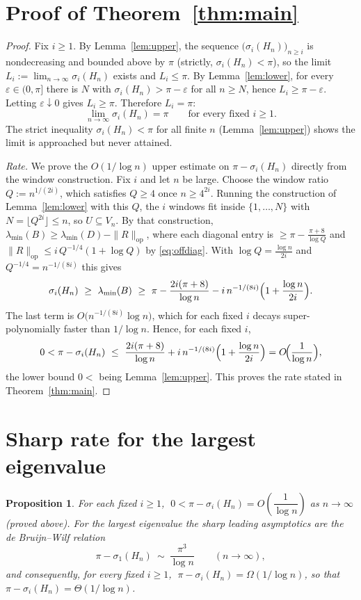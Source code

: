 \documentclass[12pt]{article}
\newtheorem{proposition}{Proposition}
\theoremstyle{remark}
\begin{document}
\section{Proof of Theorem~\ref{thm:main}}

\begin{proof}
Fix $i\ge1$. By Lemma~\ref{lem:upper}, the sequence $\bigl(\sigma_i(H_n)\bigr)_{n\ge i}$ is
nondecreasing and bounded above by $\pi$ (strictly, $\sigma_i(H_n)<\pi$), so the limit
$L_i:=\lim_{n\to\infty}\sigma_i(H_n)$ exists and $L_i\le\pi$. By Lemma~\ref{lem:lower}, for every
$\varepsilon\in(0,\pi]$ there is $N$ with $\sigma_i(H_n)>\pi-\varepsilon$ for all $n\ge N$, hence
$L_i\ge\pi-\varepsilon$. Letting $\varepsilon\downarrow0$ gives $L_i\ge\pi$. Therefore $L_i=\pi$:
\[
\lim_{n\to\infty}\sigma_i(H_n)=\pi\qquad\text{for every fixed }i\ge1 .
\]
The strict inequality $\sigma_i(H_n)<\pi$ for all finite $n$ (Lemma~\ref{lem:upper}) shows the
limit is approached but never attained.

\emph{Rate.} We prove the $O(1/\log n)$ upper estimate on $\pi-\sigma_i(H_n)$ directly from the
window construction. Fix $i$ and let $n$ be large. Choose the window ratio $Q:=n^{1/(2i)}$, which
satisfies $Q\ge4$ once $n\ge 4^{2i}$. Running the construction of Lemma~\ref{lem:lower} with this
$Q$, the $i$ windows fit inside $\{1,\dots,N\}$ with $N=\lfloor Q^{2i}\rfloor\le n$, so
$U\subseteq V_n$. By that construction,
$\lambda_{\min}(B)\ge\lambda_{\min}(D)-\|R\|_{\mathrm{op}}$, where each diagonal entry is
$\ge\pi-\frac{\pi+8}{\log Q}$ and $\|R\|_{\mathrm{op}}\le i\,Q^{-1/4}(1+\log Q)$ by
\eqref{eq:offdiag}. With $\log Q=\frac{\log n}{2i}$ and $Q^{-1/4}=n^{-1/(8i)}$ this gives
\[
\sigma_i(H_n)\ \ge\ \lambda_{\min}(B)\ \ge\
\pi-\frac{2i(\pi+8)}{\log n}-i\,n^{-1/(8i)}\Bigl(1+\frac{\log n}{2i}\Bigr).
\]
The last term is $O\bigl(n^{-1/(8i)}\log n\bigr)$, which for each fixed $i$ decays
super-polynomially faster than $1/\log n$. Hence, for each fixed $i$,
\[
0<\pi-\sigma_i(H_n)\ \le\ \frac{2i(\pi+8)}{\log n}+i\,n^{-1/(8i)}\Bigl(1+\frac{\log n}{2i}\Bigr)
=O\!\Bigl(\frac1{\log n}\Bigr),
\]
the lower bound $0<$ being Lemma~\ref{lem:upper}. This proves the rate stated in
Theorem~\ref{thm:main}.
\end{proof}

\section{Sharp rate for the largest eigenvalue}

\begin{proposition}\label{prop:rate}
For each fixed $i\ge1$, $\;0<\pi-\sigma_i(H_n)=O\!\left(\dfrac1{\log n}\right)$ as $n\to\infty$
(proved above). For the largest eigenvalue the sharp leading asymptotics are the de Bruijn--Wilf
relation
\[
\pi-\sigma_1(H_n)\ \sim\ \frac{\pi^3}{\log n}\qquad(n\to\infty),
\]
and consequently, for every fixed $i\ge1$,
$\;\pi-\sigma_i(H_n)=\Omega(1/\log n)$, so that $\pi-\sigma_i(H_n)=\Theta(1/\log n)$.
\end{proposition}
\end{document}
